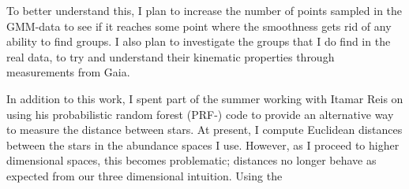 \documentclass[11pt]{article}
\begin{document}
To better understand this, I plan to increase the number of points sampled in the GMM-data to see if it reaches some point where the smoothness gets rid of any ability to find groups. I also plan to investigate the groups that I do find in the real data, to try and understand their kinematic properties through measurements from Gaia. 

In addition to this work, I spent part of the summer working with Itamar Reis on using his probabilistic random forest (PRF-\citealt{prf}) code to provide an alternative way to measure the distance between stars. At present, I compute Euclidean distances between the stars in the abundance spaces I use. However, as I proceed to higher dimensional spaces, this becomes problematic; distances no longer behave as expected from our three dimensional intuition. Using the 
\end{document}
